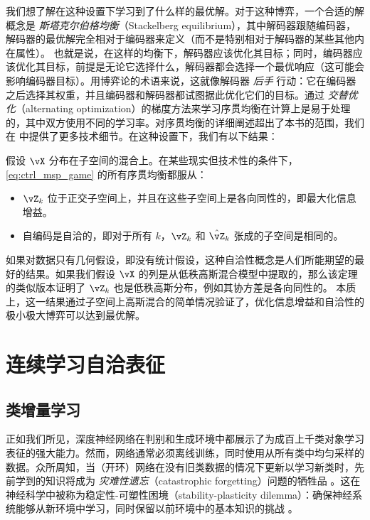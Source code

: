 \documentclass[../../book-main_zh.tex]{subfiles}
\begin{document}
我们想了解在这种设置下学习到了什么样的最优解。对于这种博弈，一个合适的解概念是 \textit{斯塔克尔伯格均衡}（Stackelberg equilibrium），其中解码器跟随编码器，解码器的最优解完全相对于编码器来定义（而不是特别相对于解码器的某些其他内在属性）。 %
也就是说，在这样的均衡下，解码器应该优化其目标；同时，编码器应该优化其目标，前提是无论它选择什么，解码器都会选择一个最优响应（这可能会影响编码器目标）。用博弈论的术语来说，这就像解码器 \textit{后手} 行动：它在编码器之后选择其权重，并且编码器和解码器都试图据此优化它们的目标。通过 \textit{交替优化}（alternating optimization）的梯度方法来学习序贯均衡在计算上是易于处理的，其中双方使用不同的学习率。对序贯均衡的详细阐述超出了本书的范围，我们在  中提供了更多技术细节。在这种设置下，我们有以下结果：
\begin{theorem}\label{thm:ctrl_theory}
    假设 \(\vX\) 分布在子空间的混合上。在某些现实但技术性的条件下，\eqref{eq:ctrl_msp_game} 的所有序贯均衡都服从：
    \begin{itemize}
        \item \(\vZ_{k}\) 位于正交子空间上，并且在这些子空间上是各向同性的，即最大化信息增益。
        \item 自编码是自洽的，即对于所有 \(k\)，\(\vZ_{k}\) 和 \(\hat{\vZ}_{k}\) 张成的子空间是相同的。
    \end{itemize}
\end{theorem}
如果对数据只有几何假设，即没有统计假设，这种自洽性概念是人们所能期望的最好的结果。如果我们假设 \(\vX\) 的列是从低秩高斯混合模型中提取的，那么该定理的类似版本证明了 \(\vZ_{k}\) 也是低秩高斯分布，例如其协方差是各向同性的。 %
本质上，这一结果通过子空间上高斯混合的简单情况验证了，优化信息增益和自洽性的极小极大博弈可以达到最优解。

\section{连续学习自洽表征}
\label{sec:continuous}

\subsection{类增量学习}
\label{sec:class-wise-incremental}

正如我们所见，深度神经网络在判别和生成环境中都展示了为成百上千类对象学习表征的强大能力。然而，网络通常必须离线训练，同时使用从所有类中均匀采样的数据。众所周知，当（开环）网络在没有旧类数据的情况下更新以学习新类时，先前学到的知识将成为 {\em 灾难性遗忘}（catastrophic forgetting）问题的牺牲品 \cite{McCloskey1989catastrophic}。这在神经科学中被称为稳定性-可塑性困境（stability-plasticity dilemma）：确保神经系统能够从新环境中学习，同时保留以前环境中的基本知识的挑战 \cite{Grossberg1987CompetitiveLF}。
\end{document}
